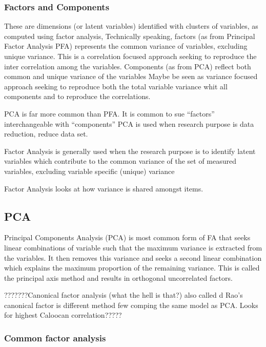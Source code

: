 \documentclass[]{book}
\theoremstyle{definition}
\theoremstyle{definition}
\theoremstyle{definition}
\theoremstyle{remark}
\begin{document}
\subsubsection{Factors and Components}\label{factors-and-components}

These are dimensions (or latent variables) identified with clusters of
variables, as computed using factor analysis, Technically speaking,
factors (as from Principal Factor Analysis PFA) represents the common
variance of variables, excluding unique variance. This is a correlation
focused approach seeking to reproduce the inter correlation among the
variables. Components (as from PCA) reflect both common and unique
variance of the variables Maybe be seen as variance focused approach
seeking to reproduce both the total variable variance whit all
components and to reproduce the correlations.

PCA is far more common than PFA. It is common to sue ``factors''
interchangeable with ``components'' PCA is used when research purpose is
data reduction, reduce data set.

Factor Analysis is generally used when the research purpose is to
identify latent variables which contribute to the common variance of the
set of measured variables, excluding variable specific (unique) variance

Factor Analysis looks at how variance is shared amongst items.

\subsection{PCA}\label{pca}

Principal Components Analysis (PCA) is most common form of FA that seeks
linear combinations of variable such that the maximum variance is
extracted from the variables. It then removes this variance and seeks a
second linear combination which explains the maximum proportion of the
remaining variance. This is called the principal axis method and results
in orthogonal uncorrelated factors.

???????Canonical factor analysis (what the hell is that?) also called d
Rao's canonical factor is different method few comping the same model as
PCA. Looks for highest Caloocan correlation?????

\subsubsection{Common factor analysis}\label{common-factor-analysis}
\end{document}
